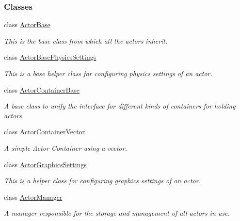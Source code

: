 \subsubsection*{Classes}
\begin{DoxyCompactItemize}
\item 
class \hyperlink{classphys_1_1ActorBase}{ActorBase}
\begin{DoxyCompactList}\small\item\em This is the base class from which all the actors inherit. \item\end{DoxyCompactList}\item 
class \hyperlink{classphys_1_1ActorBasePhysicsSettings}{ActorBasePhysicsSettings}
\begin{DoxyCompactList}\small\item\em This is a base helper class for configuring physics settings of an actor. \item\end{DoxyCompactList}\item 
class \hyperlink{classphys_1_1ActorContainerBase}{ActorContainerBase}
\begin{DoxyCompactList}\small\item\em A base class to unify the interface for different kinds of containers for holding actors. \item\end{DoxyCompactList}\item 
class \hyperlink{classphys_1_1ActorContainerVector}{ActorContainerVector}
\begin{DoxyCompactList}\small\item\em A simple Actor Container using a vector. \item\end{DoxyCompactList}\item 
class \hyperlink{classphys_1_1ActorGraphicsSettings}{ActorGraphicsSettings}
\begin{DoxyCompactList}\small\item\em This is a helper class for configuring graphics settings of an actor. \item\end{DoxyCompactList}\item 
class \hyperlink{classphys_1_1ActorManager}{ActorManager}
\begin{DoxyCompactList}\small\item\em A manager responsible for the storage and management of all actors in use. \item\end{DoxyCompactList}\item 

\end{DoxyCompactItemize}
